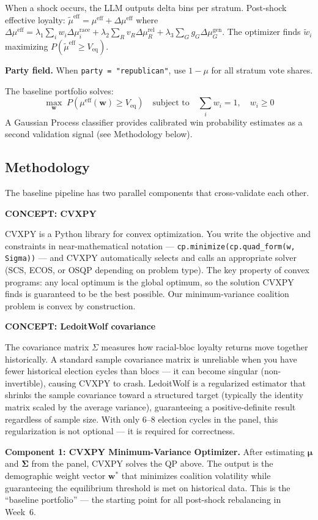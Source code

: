 \documentclass[11pt]{article}
\newcommand{\concept}[2]{%
  \begin{mdframed}[style=conceptbox]
  {\small\bfseries\color{bluefg}CONCEPT: #1}\par\smallskip #2
  \end{mdframed}}
\newcommand{\veq}{V_{\mathrm{eq}}}
\newcommand{\boldmu}{\boldsymbol{\mu}}
\newcommand{\boldSigma}{\boldsymbol{\Sigma}}
\begin{document}
When a shock occurs, the LLM outputs delta bins per stratum. Post-shock effective
loyalty: $\tilde{\mu}^{\text{eff}} = \mu^{\text{eff}} + \Delta\mu^{\text{eff}}$
where $\Delta\mu^{\text{eff}} = \lambda_1 \sum_i w_i \Delta\mu_i^{\text{race}}
+ \lambda_2 \sum_R v_R \Delta\mu_R^{\text{rel}} + \lambda_3 \sum_G g_G
\Delta\mu_G^{\text{gen}}$. The optimizer finds $\tilde{w}_i$ maximizing
$P(\tilde{\mu}^{\text{eff}} \geq \veq)$.

\textbf{Party field.} When \texttt{party = "republican"}, use $1 - \mu$ for all
stratum vote shares.

The baseline portfolio solves:
\[
  \max_{\mathbf{w}} \; P\!\left(\mu^{\text{eff}}(\mathbf{w}) \geq \veq\right)
  \quad \text{subject to} \quad
  \sum_{i} w_i = 1, \quad w_i \geq 0
\]
A Gaussian Process classifier provides calibrated win probability estimates as a
second validation signal (see Methodology below).

\subsection*{Methodology}

The baseline pipeline has two parallel components that cross-validate each other.

\concept{CVXPY}{
CVXPY is a Python library for convex optimization. You write the objective and
constraints in near-mathematical notation --- \texttt{cp.minimize(cp.quad\_form(w,
Sigma))} --- and CVXPY automatically selects and calls an appropriate solver (SCS,
ECOS, or OSQP depending on problem type). The key property of convex programs: any
local optimum is the global optimum, so the solution CVXPY finds is guaranteed to
be the best possible. Our minimum-variance coalition problem is convex by construction.
}

\concept{LedoitWolf covariance}{
The covariance matrix $\Sigma$ measures how racial-bloc loyalty returns move
together historically. A standard sample covariance matrix is unreliable when you
have fewer historical election cycles than blocs --- it can become singular
(non-invertible), causing CVXPY to crash. LedoitWolf is a regularized estimator
that shrinks the sample covariance toward a structured target (typically the
identity matrix scaled by the average variance), guaranteeing a positive-definite
result regardless of sample size. With only 6--8 election cycles in the panel,
this regularization is not optional --- it is required for correctness.
}

\textbf{Component 1: CVXPY Minimum-Variance Optimizer.}
After estimating $\boldmu$ and $\boldSigma$ from the panel, CVXPY solves the QP
above. The output is the demographic weight vector $\mathbf{w}^*$ that minimizes
coalition volatility while guaranteeing the equilibrium threshold is met on historical
data. This is the ``baseline portfolio'' --- the starting point for all post-shock
rebalancing in Week~6.
\end{document}
